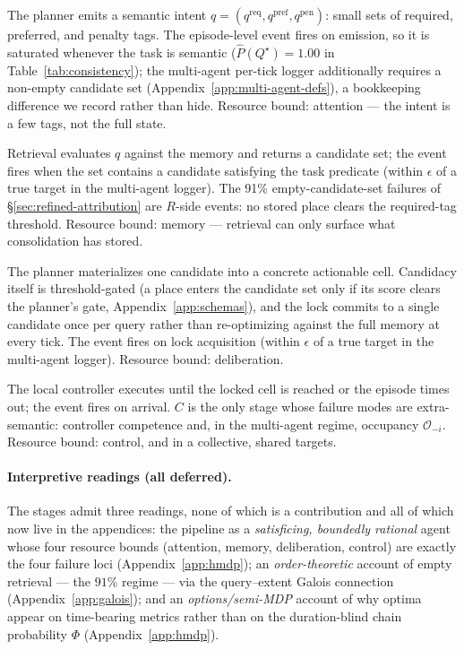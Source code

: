 \documentclass{article}
\begin{document}
\begin{description}[leftmargin=10pt,topsep=2pt,itemsep=2pt]
\item[$Q^\star$ (intent issued).] The planner emits a semantic intent $q=(q^{\mathrm{req}},q^{\mathrm{pref}},q^{\mathrm{pen}})$: small sets of required, preferred, and penalty tags. The episode-level event fires on emission, so it is saturated whenever the task is semantic ($\hat P(Q^\star){=}1.00$ in Table~\ref{tab:consistency}); the multi-agent per-tick logger additionally requires a non-empty candidate set (Appendix~\ref{app:multi-agent-defs}), a bookkeeping difference we record rather than hide. Resource bound: attention --- the intent is a few tags, not the full state.
\item[$R^\star$ (memory answers).] Retrieval evaluates $q$ against the memory and returns a candidate set; the event fires when the set contains a candidate satisfying the task predicate (within $\epsilon$ of a true target in the multi-agent logger). The 91\% empty-candidate-set failures of \S\ref{sec:refined-attribution} are $R$-side events: no stored place clears the required-tag threshold. Resource bound: memory --- retrieval can only surface what consolidation has stored.
\item[$M^\star$ (target lock).] The planner materializes one candidate into a concrete actionable cell. Candidacy itself is threshold-gated (a place enters the candidate set only if its score clears the planner's gate, Appendix~\ref{app:schemas}), and the lock commits to a single candidate once per query rather than re-optimizing against the full memory at every tick. The event fires on lock acquisition (within $\epsilon$ of a true target in the multi-agent logger). Resource bound: deliberation.
\item[$C^\star$ (closed-loop completion).] The local controller executes until the locked cell is reached or the episode times out; the event fires on arrival. $C$ is the only stage whose failure modes are extra-semantic: controller competence and, in the multi-agent regime, occupancy $\mathcal{O}_{-i}$. Resource bound: control, and in a collective, shared targets.
\end{description}

\paragraph{Interpretive readings (all deferred).} The stages admit
three readings, none of which is a contribution and all of which now
live in the appendices: the pipeline as a \emph{satisficing, boundedly
rational} agent whose four resource bounds (attention, memory,
deliberation, control) are exactly the four failure loci
(Appendix~\ref{app:hmdp}); an \emph{order-theoretic} account of empty
retrieval --- the $91\%$ regime --- via the query--extent Galois
connection (Appendix~\ref{app:galois}); and an \emph{options/semi-MDP}
account of why optima appear on time-bearing metrics rather than on
the duration-blind chain probability $\Phi$
(Appendix~\ref{app:hmdp}).
\end{document}
